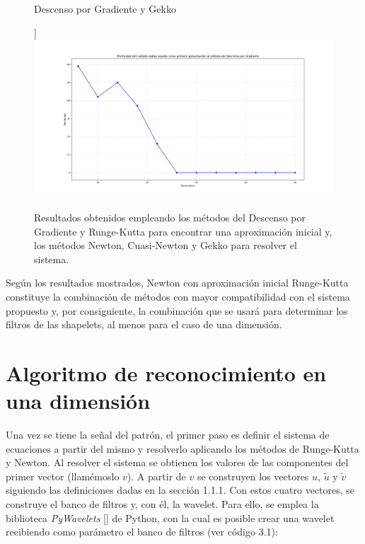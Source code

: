 \begin{figure}[h]
\begin{center}
\begin{scriptsize}
        Descenso por Gradiente y Gekko
        \end{scriptsize}]{
        \includegraphics[width=.45\textwidth]{Graphics/GD_Gekko.png}
        \label{GD-G}}
    \caption{Resultados obtenidos empleando los m\'etodos del Descenso por Gradiente y Runge-Kutta para encontrar una aproximaci\'on inicial y, los m\'etodos Newton, Cuasi-Newton y Gekko para resolver el sistema.}
    \label{metodos-combinados}
  \end{center}
\end{figure}

\par Seg\'un los resultados mostrados, Newton con aproximaci\'on inicial Runge-Kutta constituye la combinaci\'on de m\'etodos con mayor compatibilidad con el sistema propuesto y, por consiguiente, la combinaci\'on que se usar\'a para determinar los filtros de las shapelets, al menos para el caso de una dimensi\'on.\\

\section{Algoritmo de reconocimiento en una dimensi\'on}

\par Una vez se tiene la se\~nal del patr\'on, el primer paso es definir el sistema de ecuaciones a partir del mismo y resolverlo aplicando los m\'etodos de Runge-Kutta y Newton. Al resolver el sistema se obtienen los valores de las componentes del primer vector (llam\'emoslo $v$). A partir de $v$ se construyen los vectores $u$, $\tilde{u}$ y $\tilde{v}$ siguiendo las definiciones dadas en la secci\'on 1.1.1. Con estos cuatro vectores, se construye el banco de filtros y, con \'el, la wavelet. Para ello, se emplea la biblioteca \textit{PyWavelets} [\cite{27}] de Python, con la cual es posible crear una wavelet recibiendo como par\'ametro el banco de filtros (ver c\'odigo 3.1):\\

